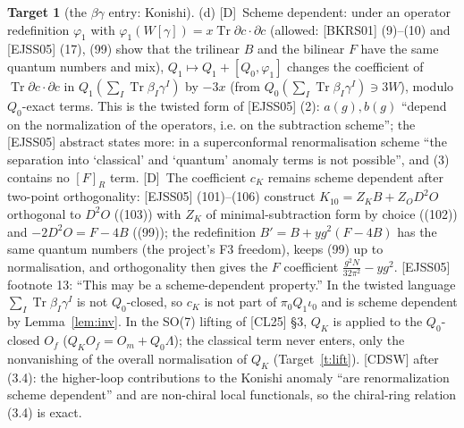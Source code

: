 \documentclass[11pt]{article}
\theoremstyle{definition}
\newtheorem{target}{Target}
\newcommand{\Tr}{\operatorname{Tr}}
\newcommand{\Dl}{\textup{[D]}}
\begin{document}
\begin{target}[the $\beta\gamma$ entry: Konishi]
(d) \Dl\ Scheme dependent: under an operator redefinition $\varphi_1$ with $\varphi_1(W[\gamma])=x\Tr\partial c\cdot\partial c$ (allowed: [BKRS01] (9)--(10) and [EJSS05] (17), (99) show that the trilinear $B$ and the bilinear $F$ have the same quantum numbers and mix), $Q_1\mapsto Q_1+[Q_0,\varphi_1]$ changes the coefficient of $\Tr\partial c\cdot\partial c$ in $Q_1(\sum_I\Tr\beta_I\gamma^I)$ by $-3x$ (from $Q_0(\sum_I\Tr\beta_I\gamma^I)\ni3W$), modulo $Q_0$-exact terms. This is the twisted form of [EJSS05] (2): $a(g),b(g)$ ``depend on the normalization of the operators, i.e. on the subtraction scheme''; the [EJSS05] abstract states more: in a superconformal renormalisation scheme ``the separation into `classical' and `quantum' anomaly terms is not possible'', and (3) contains no $[F]_R$ term. \Dl\ The coefficient $c_K$ remains scheme dependent after two-point orthogonality: [EJSS05] (101)--(106) construct $K_{10}=Z_KB+Z_OD^2O$ orthogonal to $D^2O$ ((103)) with $Z_K$ of minimal-subtraction form by choice ((102)) and $-2D^2O=F-4B$ ((99)); the redefinition $B'=B+yg^2(F-4B)$ has the same quantum numbers (the project's F3 freedom), keeps (99) up to normalisation, and orthogonality then gives the $F$ coefficient $\frac{g^2N}{32\pi^2}-yg^2$. [EJSS05] footnote 13: ``This may be a scheme-dependent property.'' In the twisted language $\sum_I\Tr\beta_I\gamma^I$ is not $Q_0$-closed, so $c_K$ is not part of $\pi_0Q_1\iota_0$ and is scheme dependent by Lemma~\ref{lem:inv}. In the SO(7) lifting of [CL25] \S3, $Q_K$ is applied to the $Q_0$-closed $O_f$ ($Q_KO_f=O_m+Q_0\Lambda$); the classical term never enters, only the nonvanishing of the overall normalisation of $Q_K$ (Target~\ref{t:lift}). [CDSW] after (3.4): the higher-loop contributions to the Konishi anomaly ``are renormalization scheme dependent'' and are non-chiral local functionals, so the chiral-ring relation (3.4) is exact.
\end{target}
\end{document}
